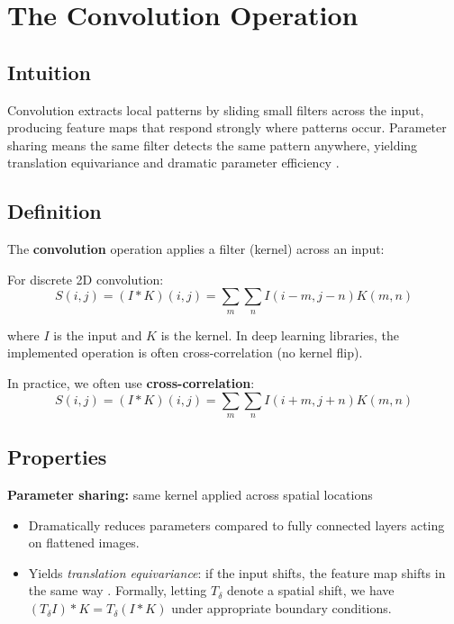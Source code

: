 
\section{The Convolution Operation}
\label{sec:convolution}

\subsection*{Intuition}
Convolution extracts local patterns by sliding small filters across the input, producing feature maps that respond strongly where patterns occur. Parameter sharing means the same filter detects the same pattern anywhere, yielding translation equivariance  and dramatic parameter efficiency \cite{GoodfellowEtAl2016,Prince2023}.

\subsection{Definition}

The \textbf{convolution} operation applies a filter (kernel) across an input:

For discrete 2D convolution:
\begin{equation}
S(i,j) = (I * K)(i,j) = \sum_m \sum_n I(i-m, j-n) K(m, n)
\end{equation}

where $I$ is the input and $K$ is the kernel. In deep learning libraries, the implemented operation is often cross-correlation (no kernel flip).

In practice, we often use \textbf{cross-correlation}:
\begin{equation}
S(i,j) = (I * K)(i,j) = \sum_m \sum_n I(i+m, j+n) K(m, n)
\end{equation}

\subsection{Properties}

\textbf{Parameter sharing:} same kernel applied across spatial locations
\begin{itemize}
    \item Dramatically reduces parameters compared to fully connected layers acting on flattened images.
    \item Yields \emph{translation equivariance}: if the input shifts, the feature map shifts in the same way \cite{GoodfellowEtAl2016,Prince2023}. Formally, letting \(T_\delta\) denote a spatial shift, we have \((T_\delta I) * K = T_\delta (I * K)\) under appropriate boundary conditions.
\end{itemize}

